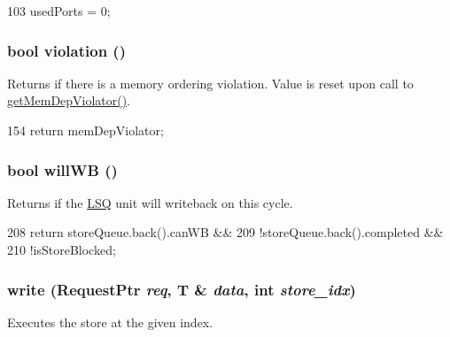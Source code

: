 \begin{DoxyCode}
103 { usedPorts = 0; }
\end{DoxyCode}
\hypertarget{classOzoneLWLSQ_a4f720bbfb5fdefdb23516500eeb0b4de}{
\subsubsection[{violation}]{\setlength{\rightskip}{0pt plus 5cm}bool violation ()}}
\label{classOzoneLWLSQ_a4f720bbfb5fdefdb23516500eeb0b4de}
Returns if there is a memory ordering violation. Value is reset upon call to \hyperlink{classOzoneLWLSQ_a30adaf6f5fb6b38b5747f35c419e3f31}{getMemDepViolator()}. 


\begin{DoxyCode}
154 { return memDepViolator; }
\end{DoxyCode}
\hypertarget{classOzoneLWLSQ_a338be821734603396bfef8d9fb8f04b0}{
\subsubsection[{willWB}]{\setlength{\rightskip}{0pt plus 5cm}bool willWB ()}}
\label{classOzoneLWLSQ_a338be821734603396bfef8d9fb8f04b0}
Returns if the \hyperlink{classLSQ}{LSQ} unit will writeback on this cycle. 


\begin{DoxyCode}
208                   { return storeQueue.back().canWB &&
209                         !storeQueue.back().completed &&
210                         !isStoreBlocked; }
\end{DoxyCode}
\hypertarget{classOzoneLWLSQ_abbf7bcc93511421a1787650a43e2642a}{
\subsubsection[{write}]{ write ({\bf RequestPtr} {\em req}, \/  T \& {\em data}, \/  int {\em store\_\-idx})}}
\label{classOzoneLWLSQ_abbf7bcc93511421a1787650a43e2642a}
Executes the store at the given index. 


